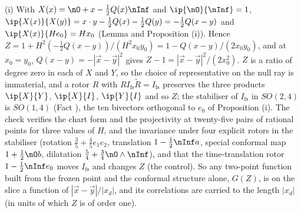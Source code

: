 (i) With $X(x) = \nO + x - \tfrac12 Q(x)\nInf$ and $\ip{\nO}{\nInf} = 1$, $\ip{X(x)}{X(y)} = x \cdot y - \tfrac12 Q(x) - \tfrac12 Q(y) = -\tfrac12 Q(x - y)$ and $\ip{X(x)}{He_{0}} = Hx_{0}$ (Lemma  and Proposition (i)). Hence $Z = 1 + H^{2}(-\tfrac12 Q(x-y))/(H^{2}x_{0}y_{0}) = 1 - Q(x-y)/(2x_{0}y_{0})$, and at $x_{0} = y_{0}$, $Q(x - y) = -|\vec x - \vec y|^{2}$ gives $Z - 1 = |\vec x - \vec y|^{2}/(2x_{0}^{2})$. $Z$ is a ratio of degree zero in each of $X$ and $Y$, so the choice of representative on the null ray is immaterial, and a rotor $R$ with $RI_{\mathrm{fs}}\tilde R = I_{\mathrm{fs}}$ preserves the three products $\ip{X}{Y}$, $\ip{X}{I}$, $\ip{Y}{I}$ and so $Z$; the stabiliser of $I_{\mathrm{fs}}$ in $SO(2,4)$ is $SO(1,4)$ (Fact ), the ten bivectors orthogonal to $e_{0}$ of Proposition (i). The check verifies the chart form and the projectivity at twenty-five pairs of rational points for three values of $H$, and the invariance under four explicit rotors in the stabiliser (rotation $\tfrac35 + \tfrac45 e_{1}e_{2}$, translation $1 - \tfrac12\nInf a$, special conformal map $1 + \tfrac12\nO b$, dilatation $\tfrac54 + \tfrac34\nO\wedge\nInf$), and that the time-translation rotor $1 - \tfrac12\nInf e_{0}$ moves $I_{\mathrm{fs}}$ and changes $Z$ (the control). So any two-point function built from the frozen point and the conformal structure alone, $G(Z)$, is on the slice a function of $|\vec x - \vec y|/|x_{d}|$, and its correlations are carried to the length $|x_{d}|$ (in units of which $Z$ is of order one).

